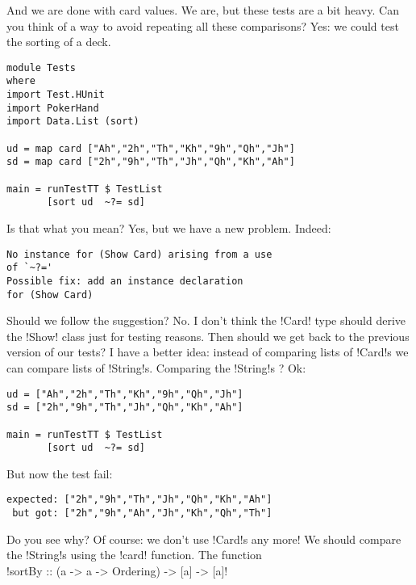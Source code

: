\success And we are done with card values.
\lhN We are, but these tests are a bit heavy. Can you think of a way to avoid repeating all these comparisons?
\lhA Yes: we could test the sorting of a deck.
\lhN  
\begin{lstlisting}[frame=single]
module Tests
where 
import Test.HUnit
import PokerHand
import Data.List (sort)

ud = map card ["Ah","2h","Th","Kh","9h","Qh","Jh"]
sd = map card ["2h","9h","Th","Jh","Qh","Kh","Ah"]

main = runTestTT $ TestList 
       [sort ud  ~?= sd]
\end{lstlisting} %
Is that what you mean?
\lhA \error Yes, but we have a new problem.
\lhN \error Indeed:
\begin{small}
\begin{verbatim}
No instance for (Show Card) arising from a use 
of `~?='
Possible fix: add an instance declaration 
for (Show Card)
\end{verbatim}
\end{small}
Should we follow the suggestion?
\lhA \error No. I don't think the \il!Card! type should derive the \il!Show! class just for testing reasons.
\lhN Then should we get back to the previous version of our tests?
\lhA I have a better idea: instead of comparing lists of \il!Card!s we can compare lists of \il!String!s.
\lhN \error Comparing the \il!String!s ? Ok:
\begin{lstlisting}[frame=single]
ud = ["Ah","2h","Th","Kh","9h","Qh","Jh"]
sd = ["2h","9h","Th","Jh","Qh","Kh","Ah"]

main = runTestTT $ TestList 
       [sort ud  ~?= sd]
\end{lstlisting} %
\failure But now the test fail:
\begin{small}
\begin{verbatim}
expected: ["2h","9h","Th","Jh","Qh","Kh","Ah"]
 but got: ["2h","9h","Ah","Jh","Kh","Qh","Th"]
\end{verbatim}
\end{small}
Do you see why?
\lhA \failure Of course: we don't use \il!Card!s any more! We should compare the \il!String!s using the \il!card! function. The function \\

\il!sortBy :: (a -> a -> Ordering) -> [a] -> [a]! \\

